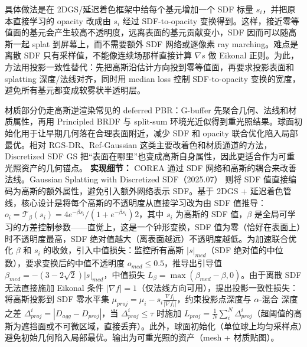 具体做法是在 2DGS/延迟着色框架中给每个基元增加一个 SDF 标量 $s_i$，并把原本直接学习的 opacity 改成由 $s_i$ 经过 SDF-to-opacity 变换得到。这样，接近零等值面的基元会产生较高不透明度，远离表面的基元贡献变小，SDF 因而可以随高斯一起 splat 到屏幕上，而不需要额外 SDF 网络或逐像素 ray marching。难点是离散 SDF 只有采样值，不能像连续场那样直接计算 $\nabla s$ 做 Eikonal 正则。为此，方法用投影一致性替代：先把高斯沿估计方向投到零等值面，再要求投影表面和 splatting 深度/法线对齐，同时用 median loss 控制 SDF-to-opacity 变换的宽度，避免所有基元都变成软雾状半透明层。

材质部分仍走高斯逆渲染常见的 deferred PBR：G-buffer 先聚合几何、法线和材质属性，再用 Principled BRDF 与 split-sum 环境光近似得到重光照结果。球面初始化用于让早期几何落在合理表面附近，减少 SDF 和 opacity 联合优化陷入局部最优。相对 RGS-DR、Ref-Gaussian 这类主要改着色和材质通道的方法，Discretized SDF GS 把“表面在哪里”也变成高斯自身属性，因此更适合作为可重光照资产的几何锚点。
\textbf{实现细节：} COREA 通过 SDF 网络和高斯的耦合来改善法线。Gaussian Splatting with Discretized SDF（2025.07） 则将 SDF 值直接编码为高斯的额外属性，避免引入额外网络表示 SDF。基于 2DGS + 延迟着色管线，核心设计是将每个高斯的不透明度从直接学习改为由 SDF 值推导：$o_i = \mathcal{T}_\beta(s_i) = 4e^{-\beta s_i}/(1+e^{-\beta s_i})^{}2$，其中 $s_i$ 为高斯的 SDF 值，$\beta$ 是全局可学习的方差控制参数——直觉上，这是一个钟形变换，SDF 值为零（恰好在表面上）时不透明度最高，SDF 绝对值越大（离表面越远）不透明度越低。为加速联合优化 $\beta$ 和 $s_i$ 的收敛，引入中值损失：监控所有高斯 $|s|_{med}$（SDF 绝对值的中位数），要求变换后的中值不透明度 $o_{med} \leq 0.5$，推导出引导值 $\beta_{med} = -(3-2\sqrt{2})|s|_{med}$，中值损失 $L_\beta = \max(\beta_{med} - \beta, 0)$。由于离散 SDF 无法直接施加 Eikonal 条件 $|\nabla f|=1$（仅法线方向可用），提出投影一致性损失：将高斯投影到 SDF 零水平集 $\mu_{proj} = \mu_i - s_i \frac{\nabla f_i}{|\nabla f_i|}$，约束投影点深度与 $\alpha$-混合 深度之差 $\Delta_{proj}^i = |D_{agg} - D_{proj}|$，当 $\Delta_{proj}^i \leq \tau$ 时施加 $L_{proj} = \frac{1}{N}\sum_{i}^{N}\Delta_{proj}^i$（超阈值的高斯为遮挡面或不可微区域，直接丢弃）。此外，球面初始化（单位球上均匀采样点）避免初始几何陷入局部最优。输出为可重光照的资产（mesh + 材质贴图）。
